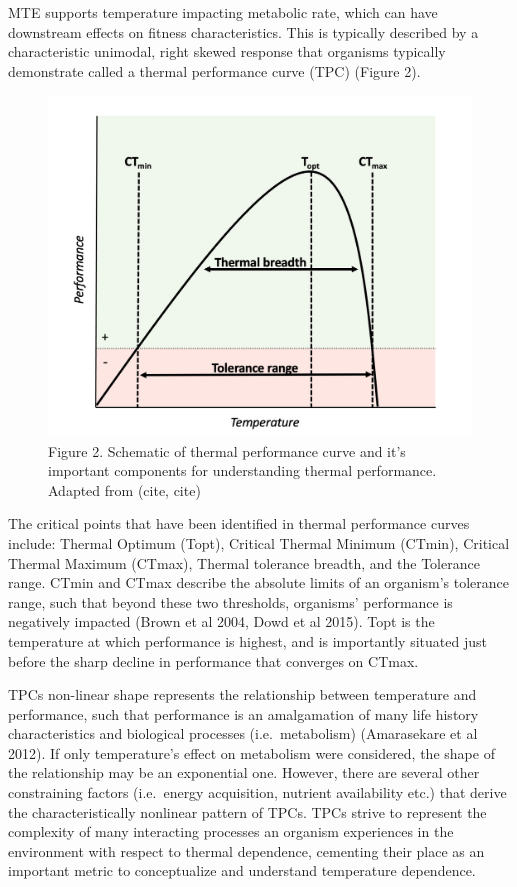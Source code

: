 \documentclass[12pt,twoside]{reedthesis}
\begin{document}
MTE supports temperature impacting metabolic rate, which can have downstream effects on fitness characteristics. This is typically described by a characteristic unimodal, right skewed response that organisms typically demonstrate called a thermal performance curve (TPC) (Figure 2).
\begin{figure}
\includegraphics[width=0.9\linewidth]{figures/figure2} \caption{Figure 2. Schematic of thermal performance curve and it’s important components for understanding thermal performance. Adapted from (cite, cite)}\label{fig:unnamed-chunk-4}
\end{figure}
The critical points that have been identified in thermal performance curves include: Thermal Optimum (Topt), Critical Thermal Minimum (CTmin), Critical Thermal Maximum (CTmax), Thermal tolerance breadth, and the Tolerance range. CTmin and CTmax describe the absolute limits of an organism's tolerance range, such that beyond these two thresholds, organisms' performance is negatively impacted (Brown et al 2004, Dowd et al 2015). Topt is the temperature at which performance is highest, and is importantly situated just before the sharp decline in performance that converges on CTmax.

TPCs non-linear shape represents the relationship between temperature and performance, such that performance is an amalgamation of many life history characteristics and biological processes (i.e.~metabolism) (Amarasekare et al 2012). If only temperature's effect on metabolism were considered, the shape of the relationship may be an exponential one. However, there are several other constraining factors (i.e.~energy acquisition, nutrient availability etc.) that derive the characteristically nonlinear pattern of TPCs. TPCs strive to represent the complexity of many interacting processes an organism experiences in the environment with respect to thermal dependence, cementing their place as an important metric to conceptualize and understand temperature dependence.
\end{document}
